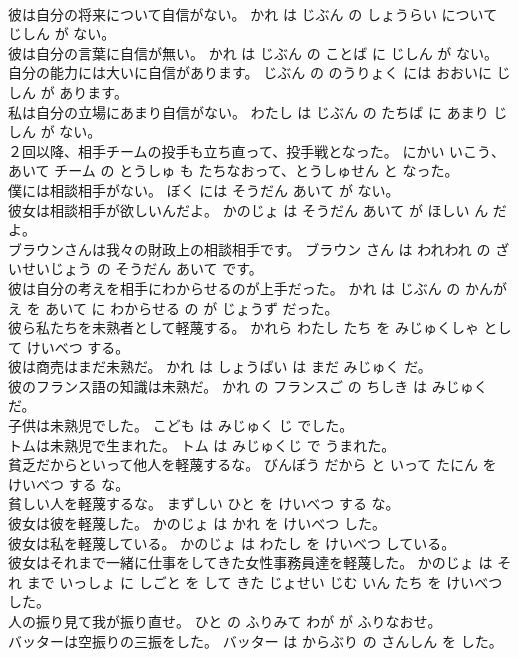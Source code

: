 \documentclass[8pt]{extreport}
\begin{document}
\begin{CJK}{UTF8}{min}
\\	彼は自分の将来について自信がない。	かれ は じぶん の しょうらい について じしん が ない。	
\\	彼は自分の言葉に自信が無い。	かれ は じぶん の ことば に じしん が ない。	
\\	自分の能力には大いに自信があります。	じぶん の のうりょく には おおいに じしん が あります。	
\\	私は自分の立場にあまり自信がない。	わたし は じぶん の たちば に あまり じしん が ない。	
\\	２回以降、相手チームの投手も立ち直って、投手戦となった。	にかい いこう、あいて チーム の とうしゅ も たちなおって、とうしゅせん と なった。	
\\	僕には相談相手がない。	ぼく には そうだん あいて が ない。	
\\	彼女は相談相手が欲しいんだよ。	かのじょ は そうだん あいて が ほしい ん だ よ。	
\\	ブラウンさんは我々の財政上の相談相手です。	ブラウン さん は われわれ の ざいせいじょう の そうだん あいて です。	
\\	彼は自分の考えを相手にわからせるのが上手だった。	かれ は じぶん の かんがえ を あいて に わからせる の が じょうず だった。	
\\	彼ら私たちを未熟者として軽蔑する。	かれら わたし たち を みじゅくしゃ として けいべつ する。	
\\	彼は商売はまだ未熟だ。	かれ は しょうばい は まだ みじゅく だ。	
\\	彼のフランス語の知識は未熟だ。	かれ の フランスご の ちしき は みじゅく だ。	
\\	子供は未熟児でした。	こども は みじゅく じ でした。	
\\	トムは未熟児で生まれた。	トム は みじゅくじ で うまれた。	
\\	貧乏だからといって他人を軽蔑するな。	びんぼう だから と いって たにん を けいべつ する な。	
\\	貧しい人を軽蔑するな。	まずしい ひと を けいべつ する な。	
\\	彼女は彼を軽蔑した。	かのじょ は かれ を けいべつ した。	
\\	彼女は私を軽蔑している。	かのじょ は わたし を けいべつ している。	
\\	彼女はそれまで一緒に仕事をしてきた女性事務員達を軽蔑した。	かのじょ は それ まで いっしょ に しごと を して きた じょせい じむ いん たち を けいべつ した。	
\\	人の振り見て我が振り直せ。	ひと の ふりみて わが が ふりなおせ。	
\\	バッターは空振りの三振をした。	バッター は からぶり の さんしん を した。	

\end{CJK}
\end{document}
